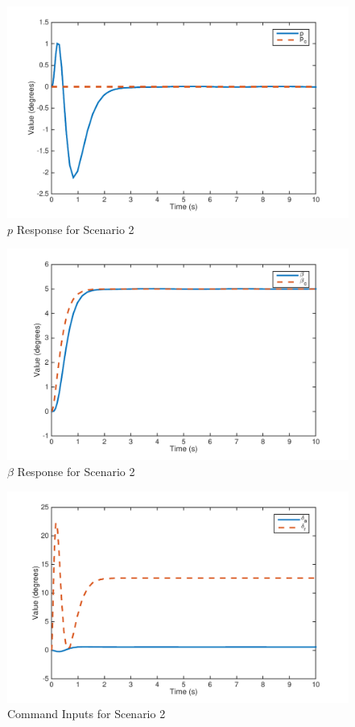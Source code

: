 \documentclass[11pt]{article}
\begin{document}
\begin{figure}[h!]
\begin{center}
\includegraphics[height=.4\textheight]{figures/p1}
\caption{$p$ Response for Scenario 2}
\end{center}
\end{figure}

\begin{figure}[h!]
\begin{center}
\includegraphics[height=.4\textheight]{figures/beta1}
\caption{$\beta$ Response for Scenario 2}
\end{center}
\end{figure}

\begin{figure}[h!]
\begin{center}
\includegraphics[height=.4\textheight]{figures/inputs1}
\caption{Command Inputs for Scenario 2}
\end{center}
\end{figure}
\end{document}
